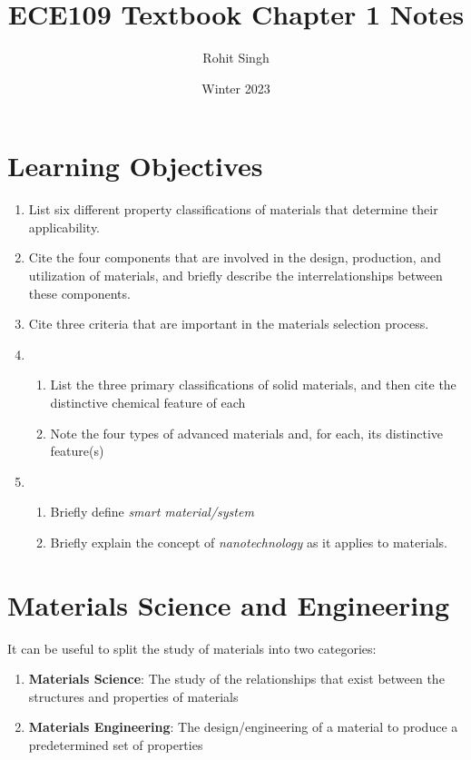 \documentclass{article}
\title{ECE109 Textbook Chapter 1 Notes}
\author{Rohit Singh}
\date{Winter 2023}
\begin{document}
\maketitle

\tableofcontents

\section{Learning Objectives}

\begin{enumerate}
    \item List six different property classifications of materials that determine their applicability.
    \item Cite the four components that are involved in the design, production, and utilization of materials, and briefly describe the interrelationships between these components.
    \item Cite three criteria that are important in the materials selection process.
    \item \begin{enumerate}
        \item List the three primary classifications of solid materials, and then cite the distinctive chemical feature of each
        \item Note the four types of advanced materials and, for each, its distinctive feature(s)
    \end{enumerate}
    \item \begin{enumerate}
        \item Briefly define \emph{smart material/system}
        \item Briefly explain the concept of \emph{nanotechnology} as it applies to materials.
    \end{enumerate}
\end{enumerate}

\section{Materials Science and Engineering}

It can be useful to split the study of materials into two categories: 

\begin{enumerate}
    \item \textbf{Materials Science}: The study of the relationships that exist between the structures and properties of materials
    \item \textbf{Materials Engineering}: The design/engineering of a material to produce a predetermined set of properties
\end{enumerate}
\end{document}
